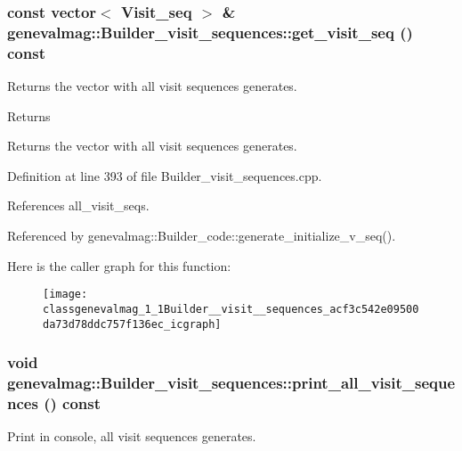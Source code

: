 \hypertarget{classgenevalmag_1_1Builder__visit__sequences_acf3c542e09500da73d78ddc757f136ec}{
\subsubsection[{get\_\-visit\_\-seq}]{\setlength{\rightskip}{0pt plus 5cm}const vector$<$ {\bf Visit\_\-seq} $>$ \& genevalmag::Builder\_\-visit\_\-sequences::get\_\-visit\_\-seq () const}}
\label{classgenevalmag_1_1Builder__visit__sequences_acf3c542e09500da73d78ddc757f136ec}
Returns the vector with all visit sequences generates. \begin{DoxyReturn}{Returns}

\end{DoxyReturn}
Returns the vector with all visit sequences generates. 

Definition at line 393 of file Builder\_\-visit\_\-sequences.cpp.



References all\_\-visit\_\-seqs.



Referenced by genevalmag::Builder\_\-code::generate\_\-initialize\_\-v\_\-seq().



Here is the caller graph for this function:\nopagebreak
\begin{figure}[H]
\begin{center}
\leavevmode
\texttt{[image: classgenevalmag\_1\_1Builder\_\_visit\_\_sequences\_acf3c542e09500da73d78ddc757f136ec\_icgraph]}
\end{center}
\end{figure}


\hypertarget{classgenevalmag_1_1Builder__visit__sequences_ad3073f1a763bdbd4812f64a16bb6a67d}{
\subsubsection[{print\_\-all\_\-visit\_\-sequences}]{\setlength{\rightskip}{0pt plus 5cm}void genevalmag::Builder\_\-visit\_\-sequences::print\_\-all\_\-visit\_\-sequences () const}}
\label{classgenevalmag_1_1Builder__visit__sequences_ad3073f1a763bdbd4812f64a16bb6a67d}
Print in console, all visit sequences generates. 

